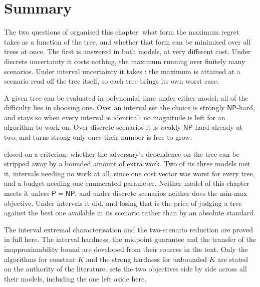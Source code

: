 \section*{Summary}

The two questions of  organised this chapter: what form the maximum regret takes as a function of the tree, and whether that form can be minimised over all trees at once.
The first is answered in both models, at very different cost.
Under discrete uncertainty it costs nothing, the maximum running over finitely many scenarios.
Under interval uncertainty it takes : the maximum is attained at a scenario read off the tree itself, so each tree brings its own worst case.

A given tree can be evaluated in polynomial time under either model; all of the difficulty lies in choosing one.
Over an interval set the choice is strongly $\mathsf{NP}$-hard, and stays so when every interval is identical: no magnitude is left for an algorithm to work on.
Over discrete scenarios it is weakly $\mathsf{NP}$-hard already at two, and turns strong only once their number is free to grow.

 closed on a criterion: whether the adversary's dependence on the tree can be stripped away by a bounded amount of extra work.
Two of its three models met it, intervals needing no work at all, since one cost vector was worst for every tree, and a budget needing one enumerated parameter.
Neither model of this chapter meets it unless $\mathsf{P} = \mathsf{NP}$, and under discrete scenarios neither does the min-max objective.
Under intervals it did, and losing that is the price of judging a tree against the best one available in its scenario rather than by an absolute standard.

The interval extremal characterisation and the two-scenario reduction are proved in full here.
The interval hardness, the midpoint guarantee and the transfer of the inapproximability bound are developed from their sources in the text.
Only the algorithms for constant $K$ and the strong hardness for unbounded $K$ are stated on the authority of the literature.
 sets the two objectives side by side across all their models, including the one left aside here.